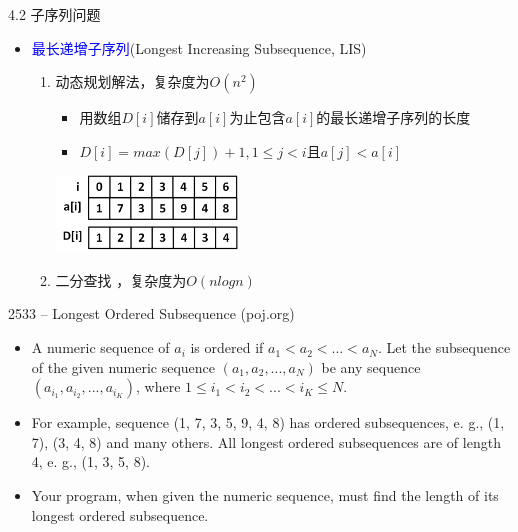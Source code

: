 \begin{frame}{4.2 子序列问题}
    \begin{itemize}
        \item \textcolor{blue}{最长递增子序列}(Longest Increasing Subsequence, LIS)
        \vfill
        \begin{enumerate}
            \item 动态规划解法，复杂度为$O(n^2)$
            \begin{itemize}
                \item 用数组$D[i]$储存到$a[i]$为止包含$a[i]$的最长递增子序列的长度
                \item $D[i]=max⁡(D[j])+1,1\leq j < i$且$a[j] < a[i]$
            \end{itemize}
            \vfill
            \includegraphics[width=0.4\textwidth]{fig/4-4.png}
            \vfill
            \item 二分查找 ，复杂度为$O(nlogn)$
        \end{enumerate}
    \end{itemize}
\end{frame}
\begin{frame}{2533 -- Longest Ordered Subsequence (poj.org)}
    \begin{itemize}
        \item A numeric sequence of $a_i$ is ordered if $a_1 < a_2 < ... < a_N$. Let the subsequence of the given numeric sequence $(a_1, a_2, ..., a_N)$ be any sequence $(a_{i_1}, a_{i_2}, ..., a_{i_K})$, where $1 \leq i_1 < i_2 < ... < i_K \leq N$.
        \item For example, sequence (1, 7, 3, 5, 9, 4, 8) has ordered subsequences, e. g., (1, 7), (3, 4, 8) and many others. All longest ordered subsequences are of length 4, e. g., (1, 3, 5, 8).
        \item Your program, when given the numeric sequence, must find the length of its longest ordered subsequence.
    \end{itemize}
\end{frame}
